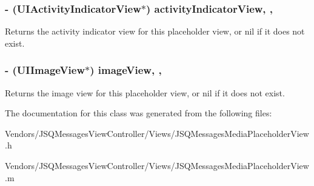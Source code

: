 \subsubsection[{activity\+Indicator\+View}]{\setlength{\rightskip}{0pt plus 5cm}-\/ (U\+I\+Activity\+Indicator\+View$\ast$) activity\+Indicator\+View\hspace{0.3cm}{\ttfamily [read]}, {\ttfamily [nonatomic]}, {\ttfamily [weak]}}\label{interface_j_s_q_messages_media_placeholder_view_a2bc45f10ad60ccc9d6ac22c13e0f60b9}
Returns the activity indicator view for this placeholder view, or {\ttfamily nil} if it does not exist. \hypertarget{interface_j_s_q_messages_media_placeholder_view_a61790e167dfc9a5a9f96bd2d8d460ddf}{}
\subsubsection[{image\+View}]{\setlength{\rightskip}{0pt plus 5cm}-\/ (U\+I\+Image\+View$\ast$) image\+View\hspace{0.3cm}{\ttfamily [read]}, {\ttfamily [nonatomic]}, {\ttfamily [weak]}}\label{interface_j_s_q_messages_media_placeholder_view_a61790e167dfc9a5a9f96bd2d8d460ddf}
Returns the image view for this placeholder view, or {\ttfamily nil} if it does not exist. 

The documentation for this class was generated from the following files\+:\begin{DoxyCompactItemize}
\item 
Vendors/\+J\+S\+Q\+Messages\+View\+Controller/\+Views/J\+S\+Q\+Messages\+Media\+Placeholder\+View.\+h\item 
Vendors/\+J\+S\+Q\+Messages\+View\+Controller/\+Views/J\+S\+Q\+Messages\+Media\+Placeholder\+View.\+m\end{DoxyCompactItemize}
